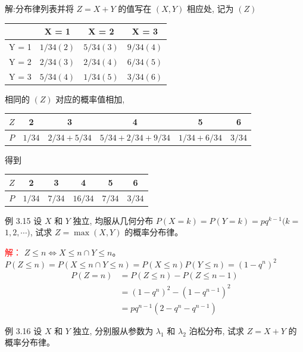 \documentclass{beamer}
\newcommand{\new}[1]{\textcolor{red}{#1}}
\begin{document}
	\begin{frame}
		解:分布律列表并将 $Z=X+Y$ 的值写在 $(X, Y)$ 相应处, 记为 $(Z)$
		
		\begin{tabular}{c|ccc}
			
			& X = 1 & X = 2 & X = 3 \\
			\hline
			Y = 1 & $1 / 34(2)$ & $5 / 34(3)$ & $9 / 34(4)$   \\
			Y = 2 & $2 / 34(3)$ & $2 / 34(4)$ & $6 / 34(5)$    \\
			Y = 3 & $5 / 34(4)$ & $1 / 34(5)$ & $3 / 34(6)$    \\
		\end{tabular}
		
		相同的 $(Z)$ 对应的概率值相加,
		
		\begin{tabular}{c|ccccc}
			$Z$ & 2 & 3 & 4 & 5 & 6 \\
			\hline
			$P$ & $1 / 34$ & $2 / 34+5 / 34$ & $5 / 34+2 / 34+9 / 34$ & $1 / 34+6 / 34$ & $3 / 34$ \\
		\end{tabular}
		
		得到
		
		\begin{tabular}{c|ccccc}
			$Z$ & 2 & 3 & 4 & 5 & 6 \\
			\hline
			$P$ & $1 / 34$ & $7 / 34$ & $16 / 34$ & $7 / 34$ & $3 / 34$ \\
		\end{tabular}
	\end{frame}
	
	\begin{frame}
		例 3.15 设 $X$ 和 $Y$ 独立, 均服从几何分布 $P(X=k)=P(Y=k)=p q^{k-1}(k=$ $1,2, \cdots)$, 试求 $Z=\max (X, Y)$ 的概率分布律。
	\end{frame}
	
	\begin{frame}
		\new{解：}
		$Z \leq n \Leftrightarrow X \leq n \cap Y \leq n$。
		$P(Z \leq n ) = P(X \leq n \cap Y \leq n) = P(X \leq n) P(Y \leq n) = (1 - q ^ n) ^2$
		\begin{align}
			P( Z = n ) & = P(Z \leq n) - P(Z \leq n - 1) \\
			& = (1 - q ^ n) ^2 - (1 - q ^ {n - 1}) ^2 \\
			& = pq ^ {n - 1}(2 - q ^ n - q ^ {n - 1})
		\end{align}
	\end{frame}
	
	\begin{frame}
		例 3.16 设 $X$ 和 $Y$ 独立, 分别服从参数为 $\lambda_{1}$ 和 $\lambda_{2}$ 泊松分布, 试求 $Z=X+Y$ 的 概率分布律。
	\end{frame}
	
\end{document}
